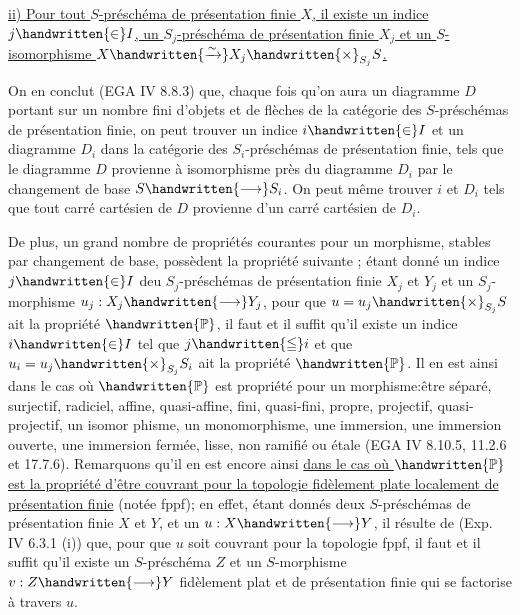\uline{ii) Pour tout $S$-préschéma de présentation finie $X$, il existe un indice $j\handwritten{\in}I$,  un $S_j$-préschéma de présentation finie $X_j$ et un $S$-isomorphisme $X\handwritten{\xrightarrow{\sim}}X_j\handwritten{\times}_{S_j}S$.}

On en conclut (EGA IV 8.8.3) que, chaque fois qu'on aura un diagramme $D$ portant sur un nombre fini d'objets et de flèches de la catégorie des $S$-préschémas de présentation finie, on peut trouver un indice $i\handwritten{\in}I$ et un diagramme $D_i$ dans la catégorie des $S_i$-préschémas de présentation finie, tels que le diagramme $D$ provienne à isomorphisme près du diagramme $D_i$ par le changement de base $S\handwritten{\longrightarrow}S_i$. On peut même trouver $i$ et $D_i$ tels que tout carré cartésien de $D$ provienne d'un carré cartésien de $D_i$.

 De plus, un grand nombre de propriétés  courantes pour un morphisme, stables par changement de base, possèdent la propriété suivante ; étant donné un indice $j\handwritten{\in}I$ deu $S_j$-préschémas de présentation finie $X_j$ et $Y_j$ et un $S_j$-morphisme $u_j:X_j\handwritten{\longrightarrow}Y_j$, pour que $u=u_j\handwritten{\times}_{S_j}S$ ait la propriété $\handwritten{\mathbb{P}}$, il faut et il suffit qu'il existe un indice $i\handwritten{\in}I$ tel que $j\handwritten{\leqq}i$ et que $u_i=u_j\handwritten{\times}_{S_j}S_i$ ait la propriété $\handwritten{\mathbb{P}}$. Il en est ainsi dans le cas où $\handwritten{\mathbb{P}}$ est  propriété pour un morphisme:être séparé, surjectif, radiciel, affine, quasi-affine, fini, quasi-fini, propre, projectif, quasi-projectif, un isomor%
%
%
phisme, un monomorphisme, une immersion, une immersion ouverte, une immersion fermée, lisse, non ramifié ou étale (EGA IV 8.10.5, 11.2.6 et 17.7.6). Remarquons qu'il en est encore ainsi  \uline{dans le cas où $\handwritten{\mathbb{P}}$ est la propriété d'être couvrant pour la topologie fidèlement plate localement de présentation finie} (notée fppf); en effet, étant donnés deux $S$-préschémas de présentation finie $X$ et $Y$, et un  $u:X\handwritten{\longrightarrow}Y$, il résulte de (Exp. IV 6.3.1 (i))\deleted{,} que, pour que $u$ soit couvrant pour la topologie fppf, il faut et il suffit qu'il existe un $S$-préschéma $Z$ et un $S$-morphisme $v:Z\handwritten{\longrightarrow}Y$ fidèlement plat et de présentation finie qui se factorise à travers $u$.


